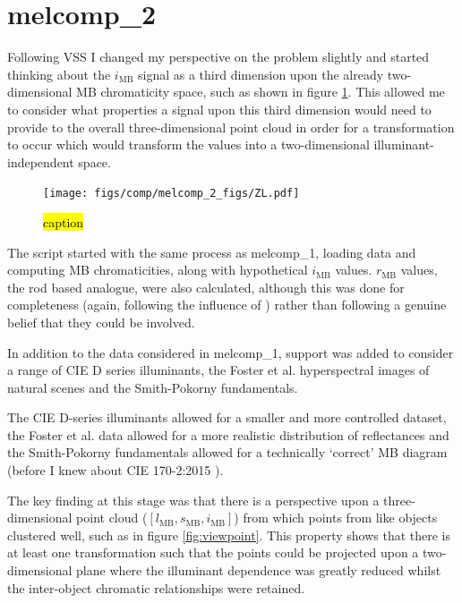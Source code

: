 \section{melcomp\_2}

Following VSS I changed my perspective on the problem slightly and started thinking about the $i_{\text{MB}}$ signal as a third dimension upon the already two-dimensional \gls{MB} chromaticity space, such as shown in figure \ref{fig:ZL}. This allowed me to consider what properties a signal upon this third dimension would need to provide to the overall three-dimensional point cloud in order for a transformation to occur which would transform the values into a two-dimensional illuminant-independent space.

\begin{figure}[htbp]
 \texttt{[image: figs/comp/melcomp\_2\_figs/ZL.pdf]}
 \caption{\hl{caption}}
 \label{fig:ZL}
\end{figure} 

The script started with the same process as melcomp\_1, loading data and computing \gls{MB} chromaticities, along with hypothetical $i_{\text{MB}}$ values. $r_{\text{MB}}$ values, the rod based analogue, were also calculated, although this was done for completeness (again, following the influence of \cite{barrionuevo_contributions_2014}) rather than following a genuine belief that they could be involved.

In addition to the data considered in melcomp\_1, support was added to consider a range of CIE D series illuminants, the Foster et al. hyperspectral images of natural scenes and the Smith-Pokorny fundamentals.

The CIE D-series illuminants allowed for a smaller and more controlled dataset, the Foster et al. data allowed for a more realistic distribution of reflectances and the Smith-Pokorny fundamentals allowed for a technically `correct' \gls{MB} diagram (before I knew about CIE 170-2:2015 \cite{cie_cie_2015}).

The key finding at this stage was that there is a perspective upon a three-dimensional point cloud ($[l_{\text{MB}},s_{\text{MB}},i_{\text{MB}}]$) from which points from like objects clustered well, such as in figure \ref{fig:viewpoint}. This property shows that there is at least one transformation such that the points could be projected upon a two-dimensional plane where the illuminant dependence was greatly reduced whilst the inter-object chromatic relationships were retained. 

